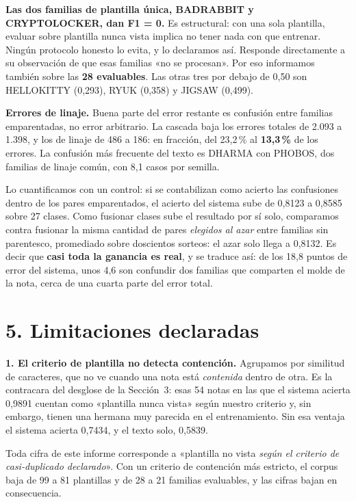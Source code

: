 \documentclass[11pt,a4paper]{article}
\begin{document}
\textbf{Las dos familias de plantilla única, BADRABBIT y CRYPTOLOCKER, dan F1 = 0.} Es estructural:
con una sola plantilla, evaluar sobre plantilla nunca vista implica no tener nada con que entrenar.
Ningún protocolo honesto lo evita, y lo declaramos así. Responde directamente a su observación de
que esas familias «no se procesan». Por eso informamos también sobre las \textbf{28 evaluables}.
Las otras tres por debajo de 0,50 son HELLOKITTY (0,293), RYUK (0,358) y JIGSAW (0,499).

\textbf{Errores de linaje.} Buena parte del error restante es confusión entre familias
emparentadas, no error arbitrario. La cascada baja los errores totales de 2.093 a 1.398, y los de
linaje de 486 a 186: en fracción, del 23,2\,\% al \textbf{13,3\,\%} de los errores. La confusión más
frecuente del texto es DHARMA con PHOBOS, dos familias de linaje común, con 8,1 casos por semilla.

Lo cuantificamos con un control: si se contabilizan como acierto las confusiones dentro de los pares
emparentados, el acierto del sistema sube de 0,8123 a 0,8585 sobre 27 clases. Como fusionar clases
sube el resultado por sí solo, comparamos contra fusionar la misma cantidad de pares \emph{elegidos
al azar} entre familias sin parentesco, promediado sobre doscientos sorteos: el azar solo llega a
0,8132. Es decir que \textbf{casi toda la ganancia es real}, y se traduce así: de los 18,8 puntos de
error del sistema, unos 4,6 son confundir dos familias que comparten el molde de la nota, cerca de
una cuarta parte del error total.

\section*{5. Limitaciones declaradas}

\textbf{1. El criterio de plantilla no detecta contención.} Agrupamos por similitud de caracteres,
que no ve cuando una nota está \emph{contenida} dentro de otra. Es la contracara del desglose de la
Sección~3: esas 54 notas en las que el sistema acierta 0,9891 cuentan como «plantilla nunca vista»
según nuestro criterio y, sin embargo, tienen una hermana muy parecida en el entrenamiento. Sin esa
ventaja el sistema acierta 0,7434, y el texto solo, 0,5839.

Toda cifra de este informe corresponde a «plantilla no vista \emph{según el criterio de
casi-duplicado declarado}». Con un criterio de contención más estricto, el corpus baja de 99 a 81
plantillas y de 28 a 21 familias evaluables, y las cifras bajan en consecuencia.
\end{document}
